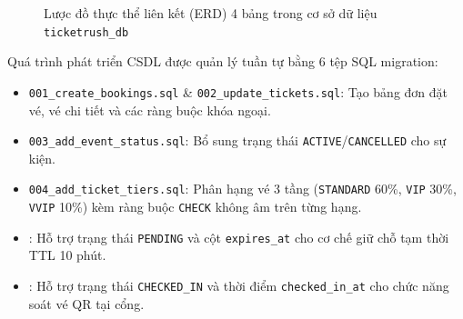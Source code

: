 \begin{figure}[H]
{
  }%
  \caption{Lược đồ thực thể liên kết (ERD) 4 bảng trong cơ sở dữ liệu \texttt{ticketrush\_db}}
  \label{fig:erd}
\end{figure}

Quá trình phát triển CSDL được quản lý tuần tự bằng 6 tệp SQL migration:
\begin{itemize}[leftmargin=1.5em]
  \item \texttt{001\_create\_bookings.sql} \& \texttt{002\_update\_tickets.sql}: Tạo bảng đơn đặt vé, vé chi tiết và các ràng buộc khóa ngoại.
  \item \texttt{003\_add\_event\_status.sql}: Bổ sung trạng thái \texttt{ACTIVE}/\texttt{CANCELLED} cho sự kiện.
  \item \texttt{004\_add\_ticket\_tiers.sql}: Phân hạng vé 3 tầng (\texttt{STANDARD} 60\%, \texttt{VIP} 30\%, \texttt{VVIP} 10\%) kèm ràng buộc \texttt{CHECK} không âm trên từng hạng.
  \item {}: Hỗ trợ trạng thái \texttt{PENDING} và cột \texttt{expires\_at} cho cơ chế giữ chỗ tạm thời TTL 10 phút.
  \item {}: Hỗ trợ trạng thái \texttt{CHECKED\_IN} và thời điểm \texttt{checked\_in\_at} cho chức năng soát vé QR tại cổng.
\end{itemize}

